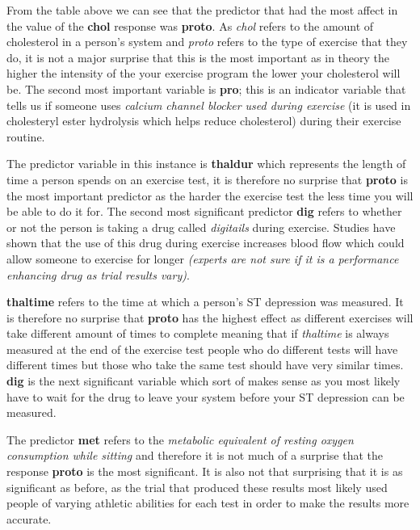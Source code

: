 \documentclass[a4paper]{article}
\begin{document}
\newpage

From the table above we can see that the predictor that had the most
affect in the value of the \textbf{chol} response was \textbf{proto}. As
\textit{chol} refers to the amount of cholesterol in a person's system and
\textit{proto} refers to the type of exercise that they do, it is not a major
surprise that this is the most important as in theory the higher the intensity
of the your exercise program the lower your cholesterol will be. The second most
important variable is \textbf{pro}; this is an indicator variable that tells us
if someone uses \textit{calcium channel blocker used during exercise} (it is
used in cholesteryl ester hydrolysis which helps reduce cholesterol) during
their exercise routine.

\newpage

The predictor variable in this instance is \textbf{thaldur} which represents the
length of time a person spends on an exercise test, it is therefore no surprise
that \textbf{proto} is the most important predictor as the harder the exercise
test the less time you will be able to do it for. The second most significant
predictor \textbf{dig} refers to whether or not the person is taking a drug
called \textit{digitails} during exercise. Studies have shown that the use of
this drug during exercise increases blood flow which could allow someone to
exercise for longer \textit{(experts are not sure if it is a performance
enhancing drug as trial results vary)}.

\newpage

\textbf{thaltime} refers to the time at which a person's ST depression was
measured. It is therefore no surprise that \textbf{proto} has the highest effect
as different exercises will take different amount of times to complete meaning
that if \textit{thaltime} is always measured at the end of the exercise test
people who do different tests will have different times but those who take the
same test should have very similar times.  \textbf{dig} is the next significant
variable which sort of makes sense as you most likely have to wait for the drug
to leave your system before your ST depression can be measured.

\newpage

The predictor \textbf{met} refers to the \textit{metabolic equivalent of resting
oxygen consumption while sitting} and therefore it is not much of a surprise
that the response \textbf{proto} is the most significant. It is also not that
surprising that it is as significant as before, as the trial that produced these
results most likely used people of varying athletic abilities for each test
in order to make the results more accurate.
\end{document}
